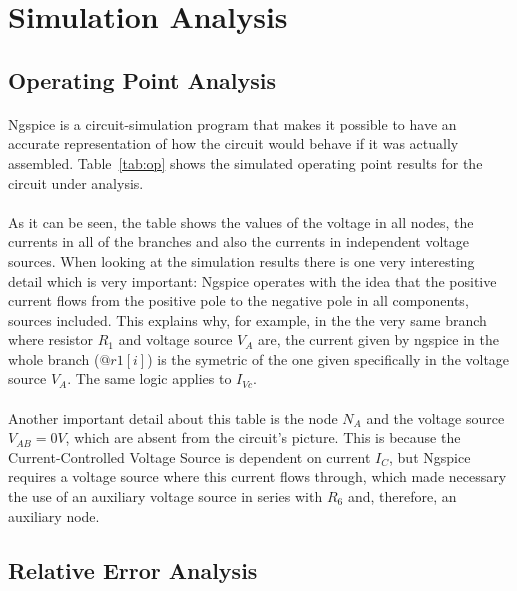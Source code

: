 \section{Simulation Analysis}
\label{sec:simulation}

\subsection{Operating Point Analysis}
\label{subsec:opa}




\paragraph{}Ngspice is a circuit-simulation program that makes it possible to have an accurate representation of how the circuit would behave if it was actually assembled. Table~\ref{tab:op} shows the simulated operating point results for the circuit
under analysis.


\paragraph{}As it can be seen, the table shows the values of the voltage in all nodes, the currents in all of the branches and also the currents in independent voltage sources. When looking at the simulation results there is one very interesting detail which is very important: Ngspice operates with the idea that the positive current flows from the positive pole to the negative pole in all components, sources included. This explains why, for example, in the the very same branch where resistor $R_1$ and voltage source $V_A$ are, the current given by ngspice in the whole branch ($@r1[i]$) is the symetric of the one given specifically in the voltage source $V_A$. The same logic applies to $I_{Vc}$. 
\paragraph{} Another important detail about this table is the node $N_A$ and the voltage source $V_{AB} = 0 V$, which are absent from the circuit's picture. This is because the Current-Controlled Voltage Source is dependent on current $I_C$, but Ngspice requires a voltage source where this current flows through, which made necessary the use of an auxiliary voltage source in series with $R_6$ and, therefore, an auxiliary node.  



\subsection{Relative Error Analysis}


